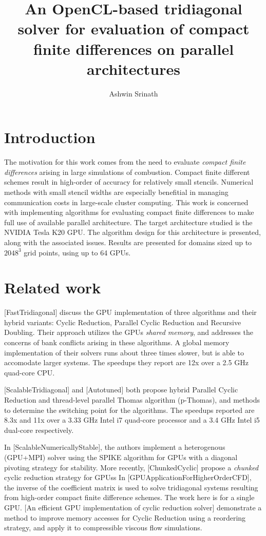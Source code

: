 \documentclass{article}
\author{Ashwin Srinath}
\title{An OpenCL-based tridiagonal solver for evaluation
    of compact finite differences on parallel architectures}
\begin{document}

\section{Introduction}

    The motivation for this work comes from the need to evaluate
    \emph{compact finite differences} arising in large simulations of combustion.
    Compact finite different schemes result in
    high-order of accuracy for relatively small stencils.
    Numerical methods with small stencil widths are especially benefitial
    in managing communication costs in large-scale cluster computing.
    This work is concerned with implementing algorithms for evaluating
    compact finite differences to make full use of available parallel architecture.
    The target architecture studied is the NVIDIA Tesla K20 GPU.
    The algorithm design for this architecture is presented,
    along with the associated issues.
    Results are presented for domains sized up to $2048^3$ grid points,
    using up to 64 GPUs.

\section{Related work}

    [FastTridiagonal] discuss the GPU implementation of three algorithms
    and their hybrid variants: Cyclic Reduction, Parallel Cyclic Reduction
    and Recursive Doubling.
    Their approach utilizes the GPUs \emph{shared memory},
    and addresses the concerns of bank conflicts arising in these algorithms.
    A global memory implementation of their solvers
    runs about three times slower, but is able to accomodate larger systems.
    The speedups they report are 12x over a 2.5 GHz quad-core CPU.

    [ScalableTridiagonal] and [Autotuned] both propose hybrid
    Parallel Cyclic Reduction and thread-level parallel Thomas algorithm (p-Thomas), and
    methods to determine the switching point for the algorithms.
    The speedups reported are 8.3x and 11x over a 3.33 GHz Intel i7 quad-core
    processor and a 3.4 GHz Intel i5 dual-core respectively.

    In [ScalableNumericallyStable],
    the authors implement a heterogenous (GPU+MPI) solver using the
    SPIKE algorithm for GPUs with a diagonal pivoting strategy for stability.
    More recently, [ChunkedCyclic] propose a \emph{chunked} cyclic reduction
    strategy for GPUss
    In [GPUApplicationForHigherOrderCFD], the inverse of the coefficient matrix
    is used to solve tridiagonal systems resulting from high-order compact
    finite difference schemes. The work here is for a single GPU.
    [An efficient GPU implementation of cyclic reduction solver] demonstrate
    a method to improve memory accesses for Cyclic Reduction
    using a reordering strategy, and apply it to compressible viscous flow
    simulations.
\end{document}
